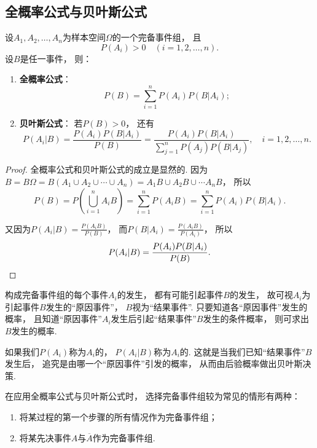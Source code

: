 \subsection{全概率公式与贝叶斯公式}
\begin{theorem}
设\(A_1,A_2,\dotsc,A_n\)为样本空间\(\Omega\)的一个完备事件组，
且\[
	P(A_i) > 0 \quad(i=1,2,\dotsc,n).
\]
设\(B\)是任一事件，
则：
\begin{enumerate}
	\item {\bf 全概率公式}：\begin{equation}
		P(B) = \sum_{i=1}^n P(A_i) P(B \vert A_i);
	\end{equation}

	\item {\bf 贝叶斯公式}：
	若\(P(B) > 0\)，
	还有\begin{equation}
		P(A_i \vert B) = \frac{P(A_i) P(B \vert A_i)}{P(B)}
		= \frac{P(A_i) P(B \vert A_i)}{\sum_{j=1}^n P(A_j) P(B \vert A_j)},
		\quad i = 1,2,\dotsc,n.
	\end{equation}
\end{enumerate}
\begin{proof}
全概率公式和贝叶斯公式的成立是显然的.
因为\(B = B \Omega
= B(A_1 \cup A_2 \cup \dotsb \cup A_n)
= A_1 B \cup A_2 B \cup \dotsb A_n B\)，
所以\[
	P(B) = P\left(\bigcup_{i=1}^n A_i B\right)
	= \sum_{i=1}^n P(A_i B)
	= \sum_{i=1}^n P(A_i) P(B \vert A_i).
\]

又因为\(P(A_i \vert B)
= \frac{P(A_i B)}{P(B)}\)，
而\(P(B \vert A_i)
= \frac{P(A_i B)}{P(A_i)}\)，
所以\[
	P(A_i \vert B) = \frac{P(A_i) P(B \vert A_i)}{P(B)}.
	\qedhere
\]
\end{proof}
\end{theorem}

构成完备事件组的每个事件\(A_i\)的发生，
都有可能引起事件\(B\)的发生，
故可视\(A_i\)为引起事件\(B\)发生的“原因事件”，
\(B\)视为“结果事件”.
只要知道各“原因事件”发生的概率，
且知道“原因事件”\(A_i\)发生后引起“结果事件”\(B\)发生的条件概率，
则可求出\(B\)发生的概率.

如果我们\(P(A_i)\)称为\(A_i\)的，
\(P(A_i \vert B)\)称为\(A_i\)的.
这就是当我们已知“结果事件”\(B\)发生后，
追究是由哪一个“原因事件”引发的概率，
从而由后验概率做出贝叶斯决策.

在应用全概率公式与贝叶斯公式时，
选择完备事件组较为常见的情形有两种：
\begin{enumerate}
	\item 将某过程的第一个步骤的所有情况作为完备事件组；

	\item 将某先决事件\(A\)与\(\overline{A}\)作为完备事件组.
\end{enumerate}

